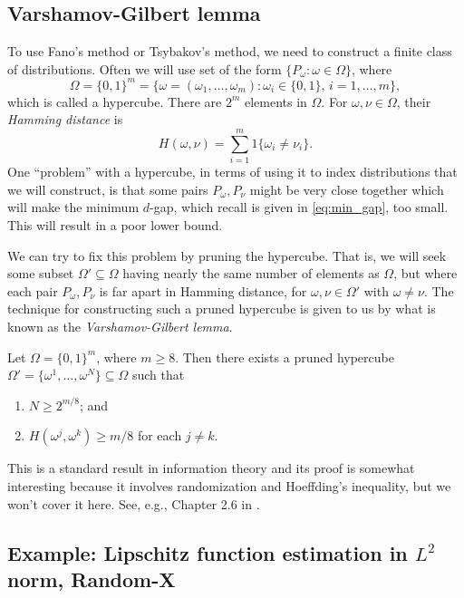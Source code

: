 \documentclass{article}
\begin{document}
\subsection{Varshamov-Gilbert lemma}

To use Fano's method or Tsybakov's method, we need to construct a finite class
of distributions. Often we will use set of the form $\{P_\omega : \omega \in
\Omega\}$, where 
\[
\Omega = \{0,1\}^m = \Big\{ \omega = (\omega_1,\dots,\omega_m) : \omega_i \in
\{0,1\}, \, i=1,\dots,m \Big\},
\]
which is called a hypercube. There are $2^m$ elements in $\Omega$. For $\omega,
\nu\in \Omega$, their \emph{Hamming distance} is  
\[
H(\omega,\nu) = \sum_{i=1}^m 1\{ \omega_i \not= \nu_i \}.
\]
One ``problem'' with a hypercube, in terms of using it to index distributions
that we will construct, is that some pairs $P_\omega, P_\nu$ might be very close
together which will make the minimum $d$-gap, which recall is given in
\eqref{eq:min_gap}, too small. This will result in a poor lower bound.  

We can try to fix this problem by pruning the hypercube. That is, we will seek some
subset $\Omega' \subseteq \Omega$ having nearly the same number of elements
as $\Omega$, but where each pair $P_\omega, P_\nu$ is far apart in Hamming
distance, for $\omega, \nu \in \Omega'$ with $\omega \not= \nu$. The technique
for constructing such a pruned hypercube is given to us by what is known as the
\emph{Varshamov-Gilbert lemma}.   

\begin{lemma}
\label{lem:vg}
Let $\Omega = \{0,1\}^m$, where $m \geq 8$. Then there exists a pruned hypercube
$\Omega' = \{ \omega^1,\dots,\omega^N \} \subseteq \Omega$ such that         
\begin{enumerate}
\item $N \geq 2^{m/8}$; and
\item $H(\omega^j,\omega^k) \geq m/8$ for each $j \not= k$.
\end{enumerate}
\end{lemma}

This is a standard result in information theory and its proof is somewhat
interesting because it involves randomization and Hoeffding's inequality, but we
won't cover it here. See, e.g., Chapter 2.6 in \citet{tsybakov2009introduction}.

\subsection{Example: Lipschitz function estimation in $L^2$ norm, Random-X}  
\label{sec:lipschitz_L2}
\end{document}
